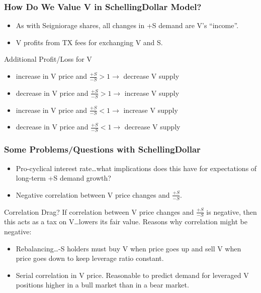 \documentclass{beamer}
\begin{document}
\begin{frame}
  \frametitle{How Do We Value V in SchellingDollar Model?}

  \begin{itemize}
  \item As with Seigniorage shares, all changes in +S demand are V's
    ``income''.
  \item V profits from TX fees for exchanging V and S.
  \end{itemize}

  \begin{block}{Additional Profit/Loss for V}
    \begin{itemize}
    \item increase in V price and $\frac{+S}{-S} > 1 \rightarrow$ decrease V supply
    \item decrease in V price and $\frac{+S}{-S} > 1 \rightarrow$ increase V supply
    \item increase in V price and $\frac{+S}{-S} < 1 \rightarrow$ increase V supply
    \item decrease in V price and $\frac{+S}{-S} < 1 \rightarrow$ decrease V supply
    \end{itemize}
  \end{block}

\end{frame}

\begin{frame}
  \frametitle{Some Problems/Questions with SchellingDollar}
  
  \begin{itemize}
  \item Pro-cyclical interest rate\dots what implications does this
    have for expectations of long-term +S demand growth?
  \item Negative correlation between V price changes and
    $\frac{+S}{-S}$.
  \end{itemize}

  \begin{block}{Correlation Drag?}
    If correlation between V price changes and $\frac{+S}{-S}$ is
    negative, then this acts as a tax on V\dots lowers its fair
    value. Reasons why correlation might be negative:
    \begin{itemize}
    \item Rebalancing\dots -S holders must buy V when price goes up
      and sell V when price goes down to keep leverage ratio
      constant.
    \item Serial correlation in V price. Reasonable to predict demand
      for leveraged V positions higher in a bull market than in a bear
      market. 
    \end{itemize}
  \end{block}

\end{frame}
\end{document}
